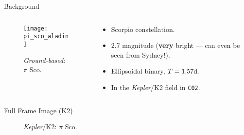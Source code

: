 \documentclass[10pt]{beamer}
\begin{document}
	\begin{frame}{Background}
		\begin{columns}[T,onlytextwidth]
			\begin{column}{.5\textwidth}
				\begin{figure}
					\centering
						\texttt{[image: pi\_sco\_aladin]}
					\caption{\textit{Ground-based}: $\pi$ Sco.}
				\end{figure}
			\end{column}

			\begin{column}{.5\textwidth}
				\begin{minipage}[c][.6\textheight][c]{\linewidth}
					\begin{itemize}
						\item Scorpio constellation.
						\item $2.7$ magnitude (\textbf{very} bright --- can even be seen from Sydney!).
						\item Ellipsoidal binary, $T = 1.57 {\rm d}$.%
						\item In the \textit{Kepler}/K2 field in \texttt{C02}.
					\end{itemize}
				\end{minipage}
			\end{column}
		\end{columns}
	\end{frame}

	\begin{frame}{Full Frame Image (K2)}
		\begin{figure}
			\centering
			\caption{\textit{Kepler}/K2: $\pi$ Sco.}
		\end{figure}
	\end{frame}
\end{document}
